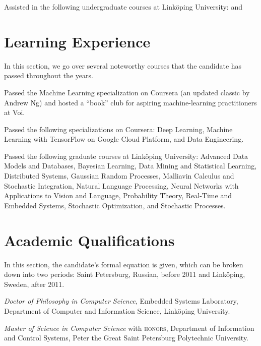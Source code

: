 \documentclass[journal]{IEEEtran}
\begin{document}
\date{2011--2017} Assisted in the following undergraduate courses at Linköping
University:  
 and

\section{Learning Experience} 

In this section, we go over several noteworthy courses that the candidate has
passed throughout the years.

\date{2022} Passed the Machine Learning specialization on Coursera (an updated
classic by Andrew Ng) and hosted a ``book'' club for aspiring machine-learning
practitioners at Voi.

\date{2018--2019} Passed the following specializations on Coursera: Deep
Learning, Machine Learning with TensorFlow on Google Cloud Platform, and Data
Engineering.

\date{2011--2017} Passed the following graduate courses at Linköping University:
Advanced Data Models and Databases, Bayesian Learning, Data Mining and
Statistical Learning, Distributed Systems, Gaussian Random Processes, Malliavin
Calculus and Stochastic Integration, Natural Language Processing, Neural
Networks with Applications to Vision and Language, Probability Theory, Real-Time
and Embedded Systems, Stochastic Optimization, and Stochastic Processes.

\section{Academic Qualifications} 

In this section, the candidate's formal equation is given, which can be broken
down into two periods: Saint Petersburg, Russian, before 2011 and Linköping,
Sweden, after 2011.

\date{2017} \emph{Doctor of Philosophy in Computer Science}, Embedded Systems
Laboratory, Department of Computer and Information Science, Linköping
University.

\date{2010} \emph{Master of Science in Computer Science} with \textsc{honors},
Department of Information and Control Systems, Peter the Great Saint Petersburg
Polytechnic University.
\end{document}
